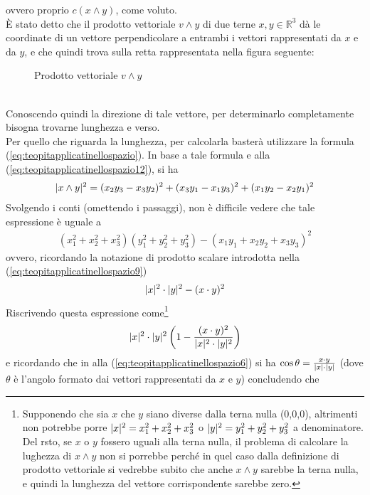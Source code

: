 ovvero proprio $c(x\wedge y)$, come voluto.\\
È stato detto che il prodotto vettoriale $v \wedge y$ di due terne $x,y\in \mathds{R}^3$ dà le coordinate di un vettore perpendicolare a entrambi i vettori rappresentati da $x$ e da $y$, e che quindi trova sulla retta rappresentata nella figura seguente:
  \begin{figure}[ht!]
    \centering
    \resizebox{5cm}{!}{
      
    }
    \caption{Prodotto vettoriale  $v \wedge y$}
    \label{fig:prodvectvwedgey}
  \end{figure}\\
  Conoscendo quindi la direzione di tale vettore, per determinarlo completamente bisogna trovarne lunghezza e verso.\\
  Per quello che riguarda la lunghezza, per calcolarla basterà utilizzare la formula (\ref{eq:teopitapplicatinellospazio}). In base a tale formula e alla (\ref{eq:teopitapplicatinellospazio12}), si ha
  \begin{eqnarray*}
    \lvert x\wedge y\rvert^2=(x_2y_3-x_3y_2)^2+(x_3y_1-x_1y_3)^2+(x_1y_2-x_2y_1)^2
  \end{eqnarray*}
Svolgendo i conti (omettendo i passaggi), non è difficile vedere che tale espressione è uguale a
  \begin{eqnarray*}
    (x_1^2+x_2^2+x_3^2)(y_1^2+y_2^2+y_3^2)-(x_1y_1+x_2y_2+x_3y_3)^2
  \end{eqnarray*}
  ovvero, ricordando la notazione di prodotto scalare introdotta nella (\ref{eq:teopitapplicatinellospazio9})
  \begin{eqnarray*}
    \lvert x\rvert^2\cdot\lvert y\rvert^2-(x\cdot y)^2
  \end{eqnarray*}
  Riscrivendo questa espressione come\footnote{Supponendo che sia $x$ che $y$ siano diverse dalla terna nulla (0,0,0), altrimenti non potrebbe porre $\lvert x\rvert^2=x_1^2+x_2^2+x_3^2$ o $\lvert y\rvert^2=y_1^2+y_2^2+y_3^2$ a denominatore. Del rsto, se $x$ o $y$ fossero uguali alla terna nulla, il problema di calcolare la lughezza di $x\wedge y$ non si porrebbe perché in quel caso dalla definizione di prodotto vettoriale si vedrebbe subito che anche $x\wedge y$ sarebbe la terna nulla, e quindi la lunghezza del vettore corrispondente sarebbe zero.}
  \begin{eqnarray*}
    \lvert x\rvert^2\cdot\lvert y\rvert^2\left(1-\frac{(x\cdot y)^2}{\lvert x\rvert^2\cdot\lvert y\rvert^2}\right)
  \end{eqnarray*}
  e ricordando che in alla (\ref{eq:teopitapplicatinellospazio6}) si ha $\cos\theta=\frac{x\cdot y}{\lvert x\rvert\cdot\lvert y\rvert}$ (dove $\theta$ è l'angolo formato dai vettori rappresentati da $x$ e $y$) concludendo che
